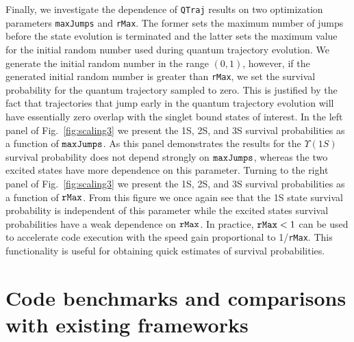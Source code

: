 \documentclass[times,sort&compress,final]{elsarticle}
\newcommand{\redflag}[1]{{\color{red} #1}}
\def\qtraj{{\tt QTraj} }
\begin{document}
Finally, we investigate the dependence of \qtraj results on two optimization parameters {\tt maxJumps} and {\tt rMax}.  The former sets the maximum number of jumps before the state evolution is terminated and the latter sets the maximum value for the initial random number used during quantum trajectory evolution.  We generate the initial random number in the range $(0,1)$, however, if the generated initial random number is greater than {\tt rMax}, we set the survival probability for the quantum trajectory sampled to zero.  This is justified by the fact that trajectories that jump early in the quantum trajectory evolution will have essentially zero overlap with the singlet bound states of interest.  In the left panel of Fig.~\ref{fig:scaling3} we present the 1S, 2S, and 3S survival probabilities as a function of ${\tt maxJumps}$.  As this panel demonstrates the results for the $\Upsilon(1S)$ survival probability does not depend strongly on ${\tt maxJumps}$, whereas the two excited states have more dependence on this parameter. 
Turning to the right panel of Fig.~\ref{fig:scaling3} we present the 1S, 2S, and 3S survival probabilities as a function of ${\tt rMax}$.  From this figure we once again see that the 1S state survival probability is independent of this parameter while the excited states survival probabilities have a weak dependence on ${\tt rMax}$.  In practice, ${\tt rMax} < 1$ can be used to accelerate code execution with the speed gain proportional to 1/{\tt rMax}. This functionality is useful for obtaining quick estimates of survival probabilities.

\section{Code benchmarks and comparisons with existing frameworks}
\label{sec:benchmarks}
\end{document}
